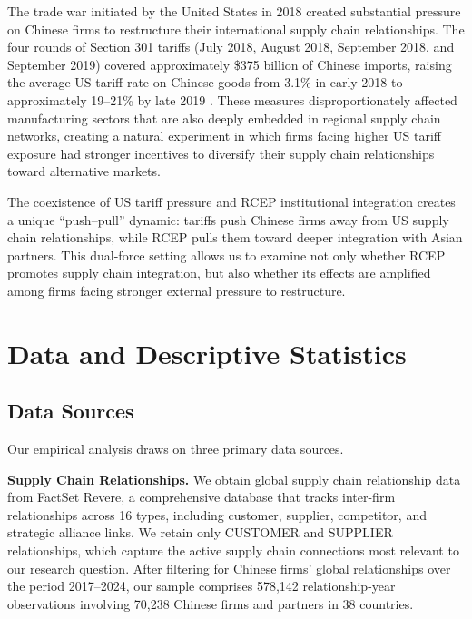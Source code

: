 \documentclass[preprint,12pt,authoryear]{elsarticle}
\begin{document}
The trade war initiated by the United States in 2018 created substantial pressure on Chinese firms to restructure their international supply chain relationships. The four rounds of Section 301 tariffs (July 2018, August 2018, September 2018, and September 2019) covered approximately \$375 billion of Chinese imports, raising the average US tariff rate on Chinese goods from 3.1\% in early 2018 to approximately 19--21\% by late 2019 \citep{bown2022four}. These measures disproportionately affected manufacturing sectors that are also deeply embedded in regional supply chain networks, creating a natural experiment in which firms facing higher US tariff exposure had stronger incentives to diversify their supply chain relationships toward alternative markets.

The coexistence of US tariff pressure and RCEP institutional integration creates a unique ``push--pull'' dynamic: tariffs push Chinese firms away from US supply chain relationships, while RCEP pulls them toward deeper integration with Asian partners. This dual-force setting allows us to examine not only whether RCEP promotes supply chain integration, but also whether its effects are amplified among firms facing stronger external pressure to restructure.

\section{Data and Descriptive Statistics}
\label{sec:data}

\subsection{Data Sources}

Our empirical analysis draws on three primary data sources.

\textbf{Supply Chain Relationships.} We obtain global supply chain relationship data from FactSet Revere, a comprehensive database that tracks inter-firm relationships across 16 types, including customer, supplier, competitor, and strategic alliance links. We retain only CUSTOMER and SUPPLIER relationships, which capture the active supply chain connections most relevant to our research question. After filtering for Chinese firms' global relationships over the period 2017--2024, our sample comprises 578,142 relationship-year observations involving 70,238 Chinese firms and partners in 38 countries.
\end{document}
